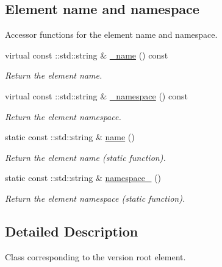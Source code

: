 \subsection*{Element name and namespace}
\label{_amgrpd4b5b61f6e07390f4af2465e04571f34}
Accessor functions for the element name and namespace. \begin{DoxyCompactItemize}
\item 
virtual const ::std::string \& \hyperlink{classopenstack_1_1xml_1_1Version___a6058656b843ba494e32cdf13c8b81903}{\_\-name} () const 
\begin{DoxyCompactList}\small\item\em Return the element name. \item\end{DoxyCompactList}\item 
virtual const ::std::string \& \hyperlink{classopenstack_1_1xml_1_1Version___a5afa8bec168dec602b3136d95559b1f1}{\_\-namespace} () const 
\begin{DoxyCompactList}\small\item\em Return the element namespace. \item\end{DoxyCompactList}\item 
static const ::std::string \& \hyperlink{classopenstack_1_1xml_1_1Version___aaa3460a52b8dc3f4207f578948660d70}{name} ()
\begin{DoxyCompactList}\small\item\em Return the element name (static function). \item\end{DoxyCompactList}\item 
static const ::std::string \& \hyperlink{classopenstack_1_1xml_1_1Version___abe52dc8a7687f5972b1497fc4c9f9325}{namespace\_\-} ()
\begin{DoxyCompactList}\small\item\em Return the element namespace (static function). \item\end{DoxyCompactList}\end{DoxyCompactItemize}


\subsection{Detailed Description}
Class corresponding to the version root element. 

